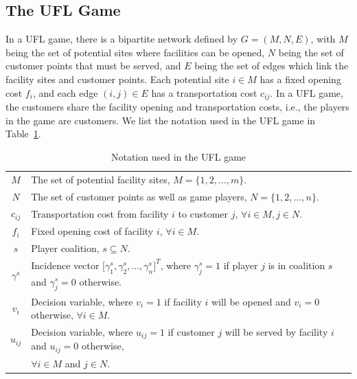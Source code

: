 \documentclass[ijoc,nonblindrev]{informs3} %
\begin{document}
\subsection{The UFL Game}\label{section:UFL}
In a UFL game, there is a bipartite network defined by $G=(M,N,E)$, with $M$ being the set of potential sites where facilities can be opened, $N$ being the set of customer points that must be served, and $E$ being the set of edges which link the facility sites and customer points. Each potential site $i \in M$ has a fixed opening cost $f_i$, and each edge $(i,j) \in E$ has a transportation cost $c_{ij}$. In a UFL game, the customers share the facility opening and transportation costs, i.e., the players in the game are customers.
We list the notation  used in the UFL game in Table~\ref{table:notationsUFL}.
\begin{table}[H]
\vspace{-2mm}
\tabcolsep=7pt
\small
\renewcommand\arraystretch{1.5}
\caption{\label{table:notationsUFL} Notation used in the UFL game}
\begin{tabular}[!h]{c c}
\hline
\multicolumn{1}{c}{$M$} &\multicolumn{1}{l}{The set of potential facility sites, $M=\big\{1,2,...,m\big\}$.}\\
\multicolumn{1}{c}{$N$} &\multicolumn{1}{l}{The set of customer points as well as game players, $N=\big\{1,2,...,n\big\}$.}\\
\multicolumn{1}{c}{$c_{ij}$} &\multicolumn{1}{l}{Transportation cost from facility $i$ to customer $j$, $\forall i \in M, j \in N$.}\\
\multicolumn{1}{c}{$f_i$} &\multicolumn{1}{l}{Fixed opening cost of facility $i$, $\forall i \in M$.}\\
\multicolumn{1}{c}{$s$} &\multicolumn{1}{l}{Player coalition, $s \subseteq N$.}\\
\multicolumn{1}{c}{$\gamma^s$} &\multicolumn{1}{l}{Incidence vector $\big[ \gamma^{s}_1,\gamma^{s}_2,...,\gamma^{s}_{n}\big]^T$, where $\gamma^{s}_j=1$ if player $j$ is in coalition $s$ and $\gamma^{s}_j=0$ otherwise.}\\
\multicolumn{1}{c}{$v_i$} &\multicolumn{1}{l}{Decision variable, where $v_i=1$ if facility $i$ will be opened and $v_i=0$ otherwise, $\forall i \in M$.}\\
\multicolumn{1}{c}{$u_{ij}$} &\multicolumn{1}{l}{Decision variable, where $u_{ij}=1$ if customer $j$ will be served by facility $i$ and $u_{ij}=0$ otherwise,}\\
\multicolumn{1}{c}{} &\multicolumn{1}{l}{ $\forall i \in M$ and $j \in N$.}\\
\hline
\end{tabular}
\vspace{-3mm}
\end{table}
\end{document}
